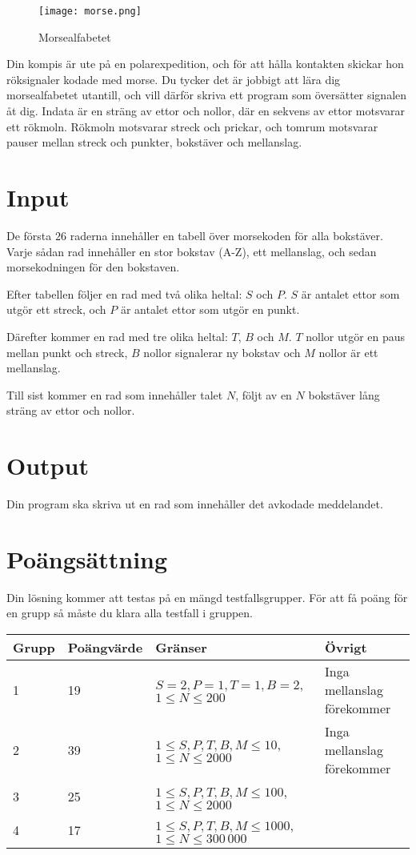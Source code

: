 
\begin{figure}[h] 
\begin{center}
\texttt{[image: morse.png]}
\caption{Morsealfabetet}
\end{center} 
\end{figure}

Din kompis är ute på en polarexpedition, och för att hålla kontakten skickar hon röksignaler kodade med morse. Du tycker det är jobbigt att lära dig morsealfabetet utantill, och vill därför skriva ett program som översätter signalen åt dig. Indata är en sträng av ettor och nollor, där en sekvens av ettor motsvarar ett rökmoln. Rökmoln motsvarar streck och prickar, och tomrum motsvarar pauser mellan streck och punkter, bokstäver och mellanslag.

\section*{Input}
De första $26$ raderna innehåller en tabell över morsekoden för alla bokstäver.
Varje sådan rad innehåller en stor bokstav (A-Z), ett mellanslag, och sedan morsekodningen för den bokstaven.

Efter tabellen följer en rad med två olika heltal: $S$ och $P$.
$S$ är antalet ettor som utgör ett streck, och $P$ är antalet ettor som utgör en punkt.

Därefter kommer en rad med tre olika heltal: $T$, $B$ och $M$.
$T$ nollor utgör en paus mellan punkt och streck, $B$ nollor signalerar ny bokstav och $M$ nollor är ett mellanslag.

Till sist kommer en rad som innehåller talet $N$, följt av en $N$ bokstäver lång sträng av ettor och nollor.

\section*{Output}
Din program ska skriva ut en rad som innehåller det avkodade meddelandet.

\section*{Poängsättning}
Din lösning kommer att testas på en mängd testfallsgrupper. För att få poäng för en grupp
så måste du klara alla testfall i gruppen.
\begin{tabular}{| l | l | l | l |}
\hline
Grupp & Poängvärde & Gränser & Övrigt \\ \hline
1     & 19         &  $S = 2, P = 1, T = 1, B = 2$, $1 \le N \le 200$  & Inga mellanslag förekommer\\ \hline
2     & 39         &  $1 \le S, P, T, B, M \le 10$, $1 \le N \le 2000$ & Inga mellanslag förekommer \\ \hline
3     & 25         &  $1 \le S, P, T, B, M \le 100$, $1 \le N \le 2000$    & \\ \hline
4     & 17        &  $1 \le S, P, T, B, M \le 1000$, $1 \le N \le 300\,000$  & \\ \hline
\end{tabular}
